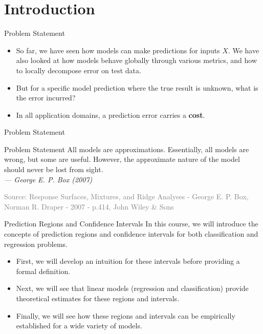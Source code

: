 \section[Introduction]{Introduction}

\begin{frame}{Problem Statement}
	\begin{itemize}
		\item So far, we have seen how models can make predictions for inputs $X$. We have also looked at how models behave globally through various metrics, and how to locally decompose error on test data. 
		\pause
		\item But for a specific model prediction where the true result is unknown, what is the error incurred?
		\pause
		\item In all application domains, a prediction error carries a \textbf{cost}.
	\end{itemize}
\end{frame}

\begin{frame}{Problem Statement}
	\begin{block}{Problem Statement}
		All models are approximations. Essentially, all models are wrong, but some are useful. However, the approximate nature of the model should never be lost from sight. \\
		\vspace{0.5cm}
		\hfill
		\textit{--- George E. P. Box (2007)}
	\end{block}
	\vfill 
	\tiny \textcolor{gray}{Source: Response Surfaces, Mixtures, and Ridge Analyses - George E. P. Box, Norman R. Draper - 2007 - p.414, John Wiley \& Sons}
\end{frame}

\begin{frame}{Prediction Regions and Confidence Intervals}
	In this course, we will introduce the concepts of prediction regions and confidence intervals for both classification and regression problems.
	\begin{itemize}
		\item First, we will develop an intuition for these intervals before providing a formal definition.
		\pause
		\item Next, we will see that linear models (regression and classification) provide theoretical estimates for these regions and intervals.
		\pause
		\item Finally, we will see how these regions and intervals can be empirically established for a wide variety of models.
	\end{itemize}
\end{frame}